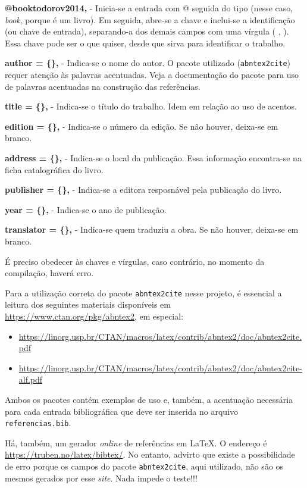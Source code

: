 {\textbf{@book{todorov2014,}} - Inicia-se a entrada com @ seguida do tipo (nesse caso, \textit{book}, porque é um livro). Em seguida, abre-se a chave e inclui-se a identificação (ou chave de entrada), separando-a dos demais campos com uma vírgula ( , ). Essa chave pode ser o que quiser, desde que sirva para identificar o trabalho.
	
{\textbf{author     = \{\},}} - Indica-se o nome do autor. O pacote utilizado (\verb|abntex2cite|) requer atenção às palavras acentuadas. Veja a documentação do pacote para uso de palavras acentuadas na construção das referências.

{\textbf{title      = \{\},}} - Indica-se o título do trabalho. Idem em relação ao uso de acentos.

{\textbf{edition    = \{\},}} - Indica-se o número da edição. Se não houver, deixa-se em branco.

{\textbf{address    = \{\},}} - Indica-se o local da publicação. Essa informação encontra-se na ficha catalográfica do livro.

{\textbf{publisher  = \{\},}} - Indica-se a editora resposnável pela publicação do livro.

{\textbf{year       = \{\},}} - Indica-se o ano de publicação.

{\textbf{translator = \{\},}} - Indica-se quem traduziu a obra. Se não houver, deixa-se em branco.

É preciso obedecer às chaves e vírgulas, caso contrário, no momento da compilação, haverá erro.

Para a utilização correta do pacote \verb|abntex2cite| nesse projeto, é essencial a leitura dos seguintes materiais disponíveis em \url{https://www.ctan.org/pkg/abntex2}, em especial:

\begin{itemize}
    \item \url{https://linorg.usp.br/CTAN/macros/latex/contrib/abntex2/doc/abntex2cite.pdf}
    \item \url{https://linorg.usp.br/CTAN/macros/latex/contrib/abntex2/doc/abntex2cite-alf.pdf}
\end{itemize}

Ambos os pacotes contém exemplos de uso e, também, a acentuação necessária para cada entrada bibliográfica que deve ser inserida no arquivo \verb|referencias.bib|.

Há, também, um gerador \textit{online} de referências em \LaTeX. O endereço é \url{https://truben.no/latex/bibtex/}. No entanto, advirto que existe a possibilidade de erro porque os campos do pacote \verb|abntex2cite|, aqui utilizado, não são os mesmos gerados por esse \textit{site}. Nada impede o teste!!!

}
